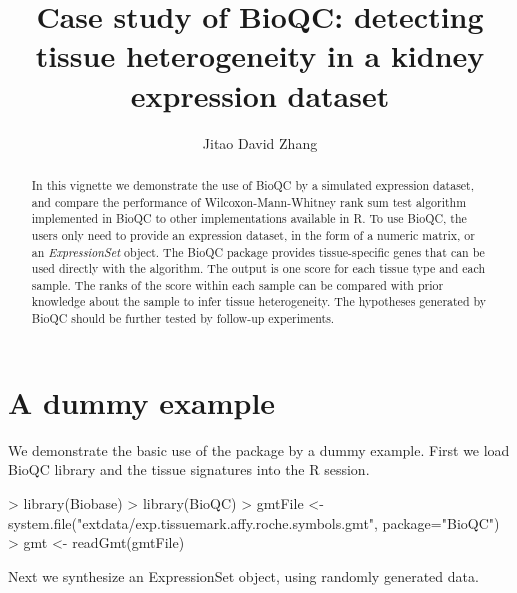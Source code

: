 \documentclass[11pt]{article}
\begin{document}
\title{Case study of BioQC: detecting tissue heterogeneity in a kidney expression dataset}
\author{Jitao David Zhang}

\maketitle

\begin{abstract}
  In this vignette we demonstrate the use of BioQC by a simulated expression dataset, and compare the performance of Wilcoxon-Mann-Whitney rank sum test algorithm implemented in BioQC to other implementations available in R. To use BioQC, the users only need to provide an expression dataset, in the form of a numeric matrix, or an \textit{ExpressionSet} object. The BioQC package provides tissue-specific genes that can be used directly with the algorithm. The output is one score for each tissue type and each sample. The ranks of the score within each sample can be compared with prior knowledge about the sample to infer tissue heterogeneity. The hypotheses generated by BioQC should be further tested by follow-up experiments.
\end{abstract}

\section{A dummy example}

We demonstrate the basic use of the package by a dummy example. First we load BioQC library and the tissue signatures into the R session. 


\begin{Schunk}
\begin{Sinput}
> library(Biobase)
> library(BioQC)
> gmtFile <- system.file("extdata/exp.tissuemark.affy.roche.symbols.gmt", package="BioQC")
> gmt <- readGmt(gmtFile)
\end{Sinput}
\end{Schunk}

Next we synthesize an ExpressionSet object, using randomly generated data.
\begin{Schunk}
\end{Schunk}
\end{document}
